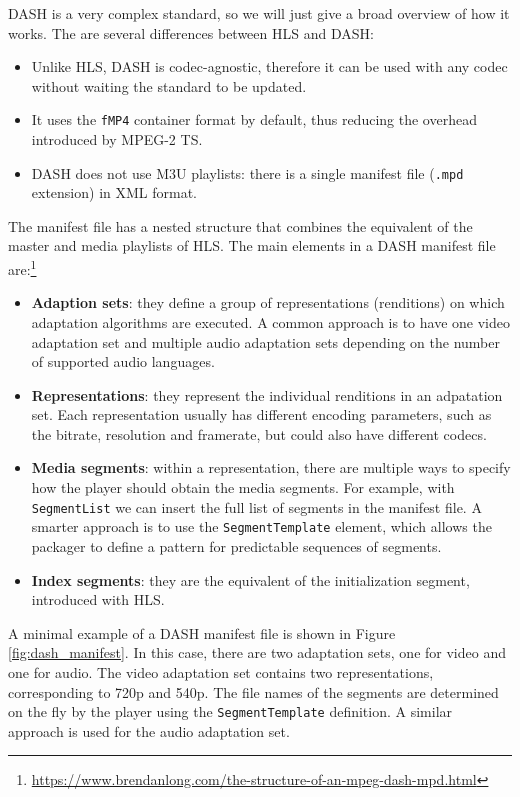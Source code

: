 DASH is a very complex standard, so we will just give a broad overview of how it works.\cite{dash}\cite{dash2} The are several differences between HLS and DASH:

\begin{itemize}
    \item Unlike HLS, DASH is codec-agnostic, therefore it can be used with any codec without waiting the standard to be updated.
    \item It uses the \texttt{fMP4} container format by default, thus reducing the overhead introduced by MPEG-2 TS.
    \item DASH does not use M3U playlists: there is a single manifest file (\texttt{.mpd} extension) in XML format.
\end{itemize}

The manifest file has a nested structure that combines the equivalent of the master and media playlists of HLS. The main elements in a DASH manifest file are:\footnote{\url{https://www.brendanlong.com/the-structure-of-an-mpeg-dash-mpd.html}}

\begin{itemize}
    \item \textbf{Adaption sets}: they define a group of representations (renditions) on which adaptation algorithms are executed. A common approach is to have one video adaptation set and multiple audio adaptation sets depending on the number of supported audio languages.
    \item \textbf{Representations}: they represent the individual renditions in an adpatation set. Each representation usually has different encoding parameters, such as the bitrate, resolution and framerate, but could also have different codecs.
    \item \textbf{Media segments}: within a representation, there are multiple ways to specify how the player should obtain the media segments. For example, with \texttt{SegmentList} we can insert the full list of segments in the manifest file. A smarter approach is to use the \texttt{SegmentTemplate} element, which allows the packager to define a pattern for predictable sequences of segments.
    \item \textbf{Index segments}: they are the equivalent of the initialization segment, introduced with HLS.
\end{itemize}

A minimal example of a DASH manifest file is shown in Figure \ref{fig:dash_manifest}. In this case, there are two adaptation sets, one for video and one for audio. The video adaptation set contains two representations, corresponding to 720p and 540p. The file names of the segments are determined on the fly by the player using the \texttt{SegmentTemplate} definition. A similar approach is used for the audio adaptation set.

